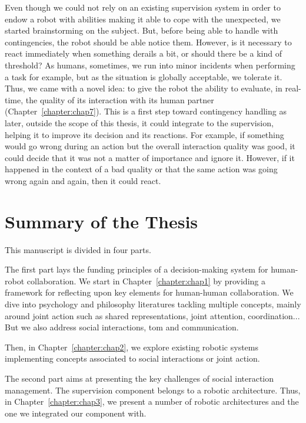 \documentclass[a4paper,11pt,twoside]{StyleThese}
\begin{document}
Even though we could not rely on an existing supervision system in order to endow a robot with abilities making it able to cope with the unexpected, we started brainstorming on the subject. But, before being able to handle with contingencies, the robot should be able notice them. However, is it necessary to react immediately when something derails a bit, or should there be a kind of threshold? As humans, sometimes, we run into minor incidents when performing a task for example, but as the situation is globally acceptable, we tolerate it. Thus, we came with a novel idea: to give the robot the ability to evaluate, in real-time, the quality of its interaction with its human partner (Chapter~\ref{chapter:chap7}). This is a first step toward contingency handling as later, outside the scope of this thesis, it could integrate to the supervision, helping it to improve its decision and its reactions. For example, if something would go wrong during an action but the overall interaction quality was good, it could decide that it was not a matter of importance and ignore it. However, if it happened in the context of a bad quality or that the same action was going wrong again and again, then it could react.

\section*{Summary of the Thesis}

This manuscript is divided in four parts. 

The first part lays the funding principles of a decision-making system for human-robot collaboration. We start in Chapter~\ref{chapter:chap1} by providing a framework for reflecting upon key elements for human-human collaboration. We dive into psychology and philosophy literatures tackling multiple concepts, mainly around joint action such as shared representations, joint attention, coordination... But we also address social interactions, \acrlong{tom} and communication. 

Then, in Chapter~\ref{chapter:chap2}, we explore existing robotic systems implementing concepts associated to social interactions or joint action.

\bigskip 

The second part aims at presenting the key challenges of social interaction management. The supervision component belongs to a robotic architecture. Thus, in Chapter~\ref{chapter:chap3}, we present a number of robotic architectures and the one we integrated our component with. 
\end{document}
